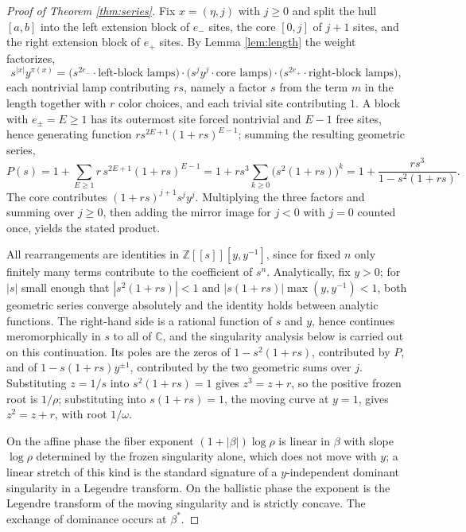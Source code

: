 \documentclass[11pt]{amsart}
\theoremstyle{definition}
\theoremstyle{remark}
\newcommand{\Z}{\mathbb{Z}}
\newcommand{\C}{\mathbb{C}}
\begin{document}
\begin{proof}[Proof of Theorem \ref{thm:series}]
Fix $x=(\eta,j)$ with $j\ge0$ and split the hull $[a,b]$ into the left extension block of $e_-$ sites, the core $[0,j]$ of $j+1$ sites, and the right extension block of $e_+$ sites. By Lemma \ref{lem:length} the weight factorizes,
\[
s^{|x|}y^{\pi(x)}
=\big(s^{2e_-}\cdot\text{left-block lamps}\big)
\cdot\big(s^{j}y^{j}\cdot\text{core lamps}\big)
\cdot\big(s^{2e_+}\cdot\text{right-block lamps}\big),
\]
each nontrivial lamp contributing $rs$, namely a factor $s$ from the term $m$ in the length together with $r$ color choices, and each trivial site contributing $1$. A block with $e_\pm=E\ge1$ has its outermost site forced nontrivial and $E-1$ free sites, hence generating function $rs^{2E+1}(1+rs)^{E-1}$; summing the resulting geometric series,
\[
P(s)=1+\sum_{E\ge1}r\,s^{2E+1}(1+rs)^{E-1}=1+rs^{3}\sum_{k\ge0}\big(s^{2}(1+rs)\big)^{k}=1+\frac{rs^{3}}{1-s^{2}(1+rs)} .
\]
The core contributes $(1+rs)^{j+1}s^{j}y^{j}$. Multiplying the three factors and summing over $j\ge0$, then adding the mirror image for $j<0$ with $j=0$ counted once, yields the stated product.

All rearrangements are identities in $\Z[[s]][y,y^{-1}]$, since for fixed $n$ only finitely many terms contribute to the coefficient of $s^{n}$. Analytically, fix $y>0$; for $|s|$ small enough that $|s^{2}(1+rs)|<1$ and $|s(1+rs)|\max(y,y^{-1})<1$, both geometric series converge absolutely and the identity holds between analytic functions. The right-hand side is a rational function of $s$ and $y$, hence continues meromorphically in $s$ to all of $\C$, and the singularity analysis below is carried out on this continuation. Its poles are the zeros of $1-s^{2}(1+rs)$, contributed by $P$, and of $1-s(1+rs)y^{\pm1}$, contributed by the two geometric sums over $j$. Substituting $z=1/s$ into $s^{2}(1+rs)=1$ gives $z^{3}=z+r$, so the positive frozen root is $1/\rho$; substituting into $s(1+rs)=1$, the moving curve at $y=1$, gives $z^{2}=z+r$, with root $1/\omega$.

On the affine phase the fiber exponent $(1+|\beta|)\log\rho$ is linear in $\beta$ with slope $\log\rho$ determined by the frozen singularity alone, which does not move with $y$; a linear stretch of this kind is the standard signature of a $y$-independent dominant singularity in a Legendre transform. On the ballistic phase the exponent is the Legendre transform of the moving singularity and is strictly concave. The exchange of dominance occurs at $\beta^{*}$.
\end{proof}
\end{document}
